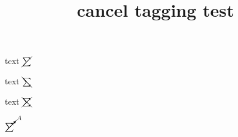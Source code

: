 \documentclass{article}
\title{cancel tagging test}
\begin{document}
text  $\cancel{\sum}$

text  $\bcancel{\sum}$

text  $\xcancel{\sum}$

$\cancelto{A}{\sum}$
\end{document}
